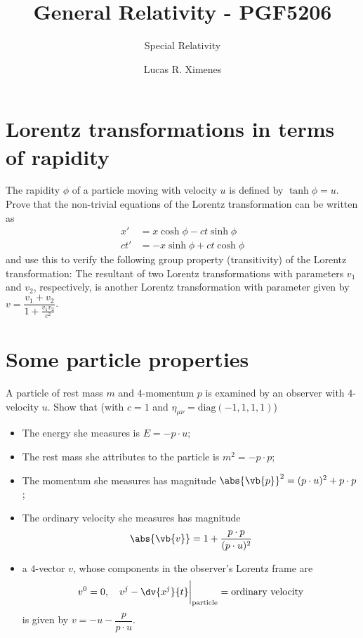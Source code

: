 \documentclass[a4paper, 11pt, oneside]{impression}
\title{General Relativity - PGF5206} %
\subtitle{Special Relativity} %
\author{Lucas R. Ximenes} %
\begin{document}
\maketitle

\chapter{Lorentz transformations in terms of rapidity}\label{quest: one}

\begin{exercise}{}
    The rapidity $\phi$ of a particle moving with velocity $u$ is defined by $\tanh\phi = u$. Prove that the non-trivial equations of the Lorentz transformation can be written as
    \begin{align*}
        x' &= x\cosh\phi - ct\sinh\phi \\
        ct' &= -x\sinh\phi + ct\cosh\phi
    \end{align*}
    and use this to verify the following group property (transitivity) of the Lorentz transformation: The resultant of two Lorentz transformations with parameters $v_{1}$ and $v_{2}$, respectively, is another Lorentz transformation with parameter given by $v = \dfrac{v_{1} + v_{2}}{1 + \frac{v_{1}v_{2}}{c^{2}}}$.
\end{exercise}



\newpage

\chapter{Some particle properties}\label{quest: two}

\begin{exercise}{}
    A particle of rest mass $m$ and $4$-momentum $p$ is examined by an observer with $4$-velocity $u$. Show that (with $c = 1$ and $\eta_{\mu\nu}=\mathrm{diag}(-1, 1, 1, 1)$)
    \begin{itemize}
        \item The energy she measures is $E = -p\cdot u$;
        \item The rest mass she attributes to the particle is $m^{2} = - p\cdot p$;
        \item The momentum she measures has magnitude $\abs{\vb{p}}^{2} = (p\cdot u)^{2} + p\cdot p$;
        \item  The ordinary velocity she measures has magnitude
        \begin{equation*}
            \abs{\vb{v}} = 1 + \dfrac{p\cdot p}{(p\cdot u)^{2}}
        \end{equation*}
        \item a $4$-vector $v$, whose components in the observer's Lorentz frame are
        \begin{equation*}
            v^{0} = 0, \quad v^{j} - \dv{x^{j}}{t}\bigg|_{\text{particle}} = \text{ordinary velocity}
        \end{equation*}
        is given by $v = -u - \dfrac{p}{p\cdot u}$.
    \end{itemize}
\end{exercise}
\end{document}

